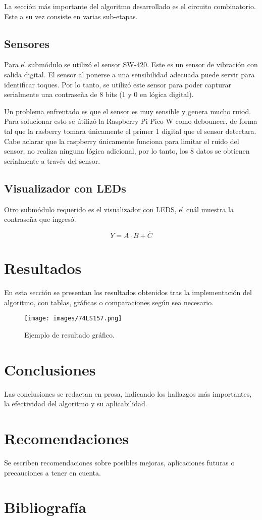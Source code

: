 \documentclass[conference]{IEEEtran}  %
\begin{document}
La sección más importante del algoritmo desarrollado es el circuito combinatorio. Este a su vez consiste en varias sub-etapas. 

\subsection{Sensores}

Para el submódulo se utilizó el sensor SW-420. Este es un sensor de vibración con salida digital. El sensor al ponerse a una sensibilidad adecuada puede servir para identificar toques. Por lo tanto, se utilizó este sensor para poder capturar serialmente una contraseña de 8 bits (1 y 0 en lógica digital).

Un problema enfrentado es que el sensor es muy sensible y genera mucho ruiod. Para solucionar esto se útilizó la Raspberry Pi Pico W como debouncer, de forma tal que la rasberry tomara únicamente el primer 1 digital que el sensor detectara. Cabe aclarar que la raspberry únicamente funciona para limitar el ruido del sensor, no realiza ninguna lógica adicional, por lo tanto, los 8 datos se obtienen serialmente a través del sensor.

\subsection{Visualizador con LEDs}

Otro submódulo requerido es el visualizador con LEDS, el cuál muestra la contraseña que ingresó. 

\begin{equation}
Y = A \cdot B + \overline{C}
\end{equation}

\section{Resultados}
En esta sección se presentan los resultados obtenidos tras la implementación del algoritmo, con tablas, gráficas o comparaciones según sea necesario.  
\begin{figure}[h]
    \centering
    \texttt{[image: images/74LS157.png]}
    \caption{Ejemplo de resultado gráfico.}
    \label{fig:resultados}
\end{figure}

\section{Conclusiones}
Las conclusiones se redactan en prosa, indicando los hallazgos más importantes, la efectividad del algoritmo y su aplicabilidad.

\section{Recomendaciones}
Se escriben recomendaciones sobre posibles mejoras, aplicaciones futuras o precauciones a tener en cuenta.

\section*{Bibliografía}

\end{document}
